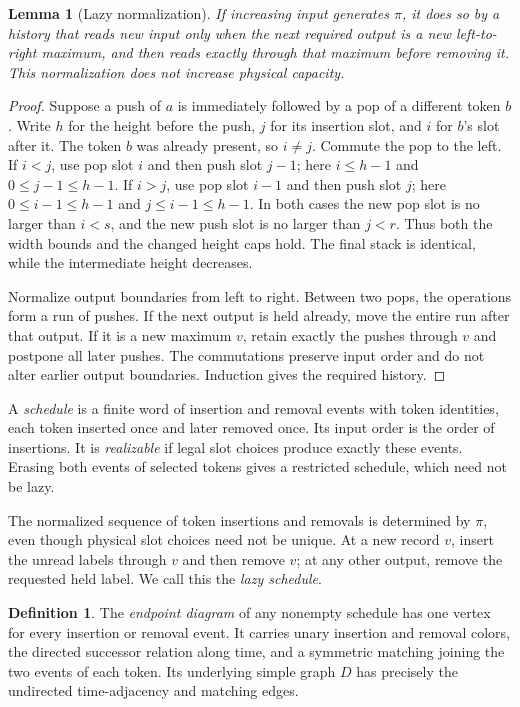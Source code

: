 \documentclass[11pt]{article}
\newtheorem{lemma}[theorem]{Lemma}
\theoremstyle{definition}\newtheorem{definition}[theorem]{Definition}
\theoremstyle{remark}\newtheorem{remark}[theorem]{Remark}
\begin{document}
\begin{lemma}[Lazy normalization]\label{lem:lazy}
If increasing input generates $\pi$, it does so by a history that reads new input only when the next required output is a new left-to-right maximum, and then reads exactly through that maximum before removing it. This normalization does not increase physical capacity.
\end{lemma}
\begin{proof}
Suppose a push of $a$ is immediately followed by a pop of a different token $b$. Write $h$ for the height before the push, $j$ for its insertion slot, and $i$ for $b$'s slot after it. The token $b$ was already present, so $i\ne j$. Commute the pop to the left. If $i<j$, use pop slot $i$ and then push slot $j-1$; here $i\le h-1$ and $0\le j-1\le h-1$. If $i>j$, use pop slot $i-1$ and then push slot $j$; here $0\le i-1\le h-1$ and $j\le i-1\le h-1$. In both cases the new pop slot is no larger than $i<s$, and the new push slot is no larger than $j<r$. Thus both the width bounds and the changed height caps hold. The final stack is identical, while the intermediate height decreases.

Normalize output boundaries from left to right. Between two pops, the operations form a run of pushes. If the next output is held already, move the entire run after that output. If it is a new maximum $v$, retain exactly the pushes through $v$ and postpone all later pushes. The commutations preserve input order and do not alter earlier output boundaries. Induction gives the required history.
\end{proof}

A \emph{schedule} is a finite word of insertion and removal events with token identities, each token inserted once and later removed once. Its input order is the order of insertions. It is \emph{realizable} if legal slot choices produce exactly these events. Erasing both events of selected tokens gives a restricted schedule, which need not be lazy.

The normalized sequence of token insertions and removals is determined by $\pi$, even though physical slot choices need not be unique. At a new record $v$, insert the unread labels through $v$ and then remove $v$; at any other output, remove the requested held label. We call this the \emph{lazy schedule}.

\begin{definition}
The \emph{endpoint diagram} of any nonempty schedule has one vertex for every insertion or removal event. It carries unary insertion and removal colors, the directed successor relation along time, and a symmetric matching joining the two events of each token. Its underlying simple graph $D$ has precisely the undirected time-adjacency and matching edges.
\end{definition}
\end{document}
